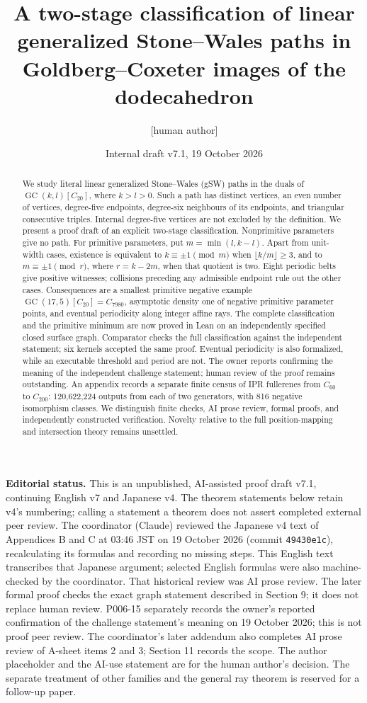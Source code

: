 \documentclass[11pt]{amsart}
\title[Two-stage classification of linear gSW paths]{A two-stage classification of linear generalized Stone--Wales paths in Goldberg--Coxeter images of the dodecahedron}
\author{[human author]}
\date{Internal draft v7.1, 19 October 2026}
\newcommand{\GC}{\operatorname{GC}}
\newcommand{\record}[1]{\nolinkurl{#1}}
\begin{document}
\begin{abstract}
We study literal linear generalized Stone--Wales (gSW) paths in the duals
of $\GC(k,l)[C_{20}]$, where $k>l>0$. Such a path has distinct vertices,
an even number of vertices, degree-five endpoints, degree-six neighbours
of its endpoints, and triangular consecutive triples. Internal
degree-five vertices are not excluded by the definition. We present a
proof draft of an explicit two-stage classification. Nonprimitive
parameters give no path. For primitive parameters, put $m=\min(l,k-l)$.
Apart from unit-width cases, existence is equivalent to $k\equiv\pm1
\pmod m$ when $\lfloor k/m\rfloor\ge3$, and to $m\equiv\pm1\pmod r$,
where $r=k-2m$, when that quotient is two. Eight periodic belts give
positive witnesses; collisions preceding any admissible endpoint rule
out the other cases. Consequences are a smallest primitive negative
example $\GC(17,5)[C_{20}]=C_{7980}$, asymptotic density one of negative
primitive parameter points, and eventual periodicity along integer
affine rays. The complete classification and the primitive minimum are now
proved in Lean on an independently specified closed surface graph.
Comparator checks the full classification against the independent
statement; six kernels accepted the same proof. Eventual periodicity
is also formalized, while an executable threshold and period are not.
The owner reports confirming the meaning of the independent challenge
statement; human review of the proof remains outstanding. An appendix records a
separate finite census of IPR fullerenes from $C_{60}$ to $C_{200}$:
120,622,224 outputs from each of two generators, with 816 negative
isomorphism classes. We distinguish finite checks, AI prose review,
formal proofs, and independently constructed verification. Novelty
relative to the full position-mapping and intersection theory remains
unsettled.
\end{abstract}
\maketitle

\noindent\textbf{Editorial status.} This is an unpublished, AI-assisted
proof draft v7.1, continuing English v7 and Japanese v4. The theorem statements below
retain v4's numbering; calling a statement a theorem does not assert
completed external peer review. The coordinator (Claude) reviewed the
Japanese v4 text of Appendices B and C at 03:46 JST on 19 October 2026
(commit \record{49430e1c}), recalculating its formulas and recording no
missing steps. This English text transcribes that Japanese argument;
selected English formulas were also machine-checked by the coordinator.
That historical review was AI prose review. The later formal proof
checks the exact graph statement described in Section 9; it does not
replace human review. P006-15 separately records the owner's
reported confirmation of the challenge statement's meaning on
19 October 2026; this is not proof peer review.
The coordinator's later addendum also completes AI prose review of A-sheet items 2 and 3; Section 11 records the scope. The author placeholder and the AI-use statement are
for the human author's decision. The separate treatment of other
families and the general ray theorem is reserved for a follow-up paper.
\end{document}
